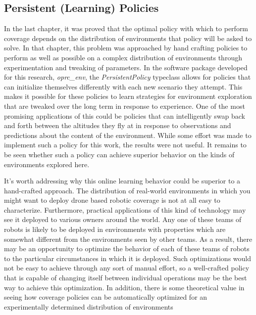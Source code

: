\subsection{Persistent (Learning) Policies}

In the last chapter, it was proved that the optimal policy with which to perform coverage depends on the distribution of environments that policy will be asked to solve. In that chapter, this problem was approached by hand crafting policies to perform as well as possible on a complex distribution of environments through experimentation and tweaking of parameters. In the software package developed for this research, \textit{oprc\_env}, the \textit{PersistentPolicy} typeclass allows for policies that can initialize themselves differently with each new scenario they attempt. This makes it possible for these policies to learn strategies for environment exploration that are tweaked over the long term in response to experience. One of the most promising applications of this could be policies that can intelligently swap back and forth between the altitudes they fly at in response to observations and predictions about the content of the environment. While some effort was made to implement such a policy for this work, the results were not useful. It remains to be seen whether such a policy can achieve superior behavior on the kinds of environments explored here.


It's worth addressing why this online learning behavior could be superior to a hand-crafted approach. The distribution of real-world environments in which you might want to deploy drone based robotic coverage is not at all easy to characterize. Furthermore, practical applications of this kind of  technology may see it deployed to various owners around the world. Any one of these teams of robots is likely to be deployed in environments with properties which are somewhat different from the environments seen by other teams. As a result, there may be an opportunity to optimize the behavior of each of these teams of robots to the particular circumstances in which it is deployed. Such optimizations would not be easy to achieve through any sort of manual effort, so a well-crafted policy that is capable of changing itself between individual operations may be the best way to achieve this optimization. In addition, there is some theoretical value in seeing how coverage policies can be automatically optimized for an experimentally determined distribution of environments

